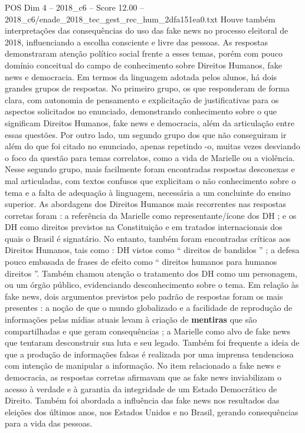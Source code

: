 \begin{textsample}{POS Dim 4 – 2018\_c6 – Score 12.00 – 2018\_c6/enade\_2018\_tec\_gest\_rec\_hum\_2dfa151ea0.txt}
Houve também interpretações das consequências do uso das fake news no processo eleitoral de 2018, influenciando a escolha consciente e livre das pessoas.
As respostas demonstraram atenção político social frente a esses temas, porém com pouco domínio conceitual do campo de conhecimento sobre Direitos Humanos, fake news e democracia.
Em termos da linguagem adotada pelos alunos, há dois grandes grupos de respostas.
No primeiro grupo, os que responderam de forma clara, com autonomia de pensamento e explicitação de justificativas para os aspectos solicitados no enunciado, demonstrando conhecimento sobre o que significam Direitos Humanos, fake news e democracia, além da articulação entre essas questões.
Por outro lado, um segundo grupo dos que não conseguiram ir além do que foi citado no enunciado, apenas repetindo -o, muitas vezes desviando o foco da questão para temas correlatos, como a vida de Marielle ou a violência.
Nesse segundo grupo, mais facilmente foram encontradas respostas desconexas e mal articuladas, com textos confusos que explicitam o não conhecimento sobre o tema e a falta de adequação à linguagem, necessária a um concluinte do ensino superior.
As abordagens dos Direitos Humanos mais recorrentes nas respostas corretas foram : a referência da Marielle como representante/ícone dos DH ; e os DH como direitos previstos na Constituição e em tratados internacionais dos quais o Brasil é signatário.
No entanto, também foram encontradas críticas aos Direitos Humanos, tais como : DH vistos como “ direitos de bandidos ” ; a defesa pouco embasada de frases de efeito como “ direitos humanos para humanos direitos ”.
Também chamou atenção o tratamento dos DH como um personagem, ou um órgão público, evidenciando desconhecimento sobre o tema.
Em relação às fake news, dois argumentos previstos pelo padrão de respostas foram os mais presentes : a noção de que o mundo globalizado e a facilidade de reprodução de informações pelas mídias atuais levam à criação de \textbf{mentiras} que são compartilhadas e que geram consequências ; a Marielle como alvo de fake news que tentaram desconstruir sua luta e seu legado.
Também foi frequente a ideia de que a produção de informações falsas é realizada por uma imprensa tendenciosa com intenção de manipular a informação.
No item relacionado a fake news e democracia, as respostas corretas afirmavam que as fake news inviabilizam o acesso à verdade e à garantia da integridade de um Estado Democrático de Direito.
Também foi abordada a influência das fake news nos resultados das eleições dos últimos anos, nos Estados Unidos e no Brasil, gerando consequências para a vida das pessoas.

\end{textsample}
